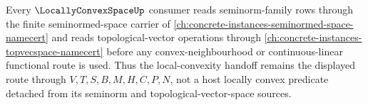Every $\LocallyConvexSpaceUp$ consumer reads seminorm-family rows through the finite seminormed-space carrier of \autoref{ch:concrete-instances-seminormed-space-namecert} and reads topological-vector operations through \autoref{ch:concrete-instances-topvecspace-namecert} before any convex-neighbourhood or continuous-linear functional route is used. Thus the local-convexity handoff remains the displayed route through $V,T,S,B,M,H,C,P,N$, not a host locally convex predicate detached from its seminorm and topological-vector-space sources.
